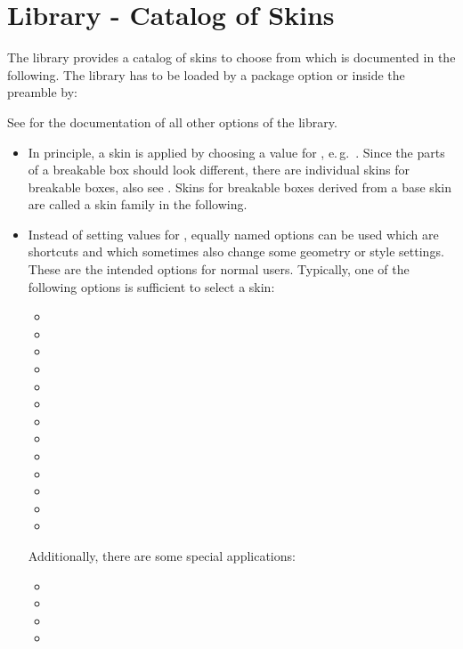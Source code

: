 \clearpage
\section{Library  - Catalog of Skins}\label{sec:skincatalog}%
%
The  library provides a catalog of skins to choose from which
is documented in the following. The  library has to be loaded
by a package option or inside the preamble by:
\begin{dispListing}
\end{dispListing}

See  for the documentation of all other options of the  library.

\begin{itemize}
\item In principle, a skin is applied by choosing a value for
  , e.\,g.\ .
  Since the parts of a breakable box should look different,
  there are individual skins for breakable boxes, also see .
  Skins for breakable boxes derived from a base skin are called a skin family
  in the following.
\item Instead of setting values for , equally named options
  can be used which are shortcuts and which sometimes also change some
  geometry or style settings. These are the intended options for normal users.
  Typically, one of the following options is sufficient to select a skin:
  \begin{itemize}
  \item {}
  \item {}
  \item {}
  \item {}
  \item {}
  \item {}
  \item {}
  \item {}
  \item {}
  \item {}
  \item {}
  \item {}
  \item {}
  \end{itemize}
  Additionally, there are some special applications:
  \begin{itemize}
  \item {}
  \item {}
  \item {}
  \item {}
  \end{itemize}
\end{itemize}



